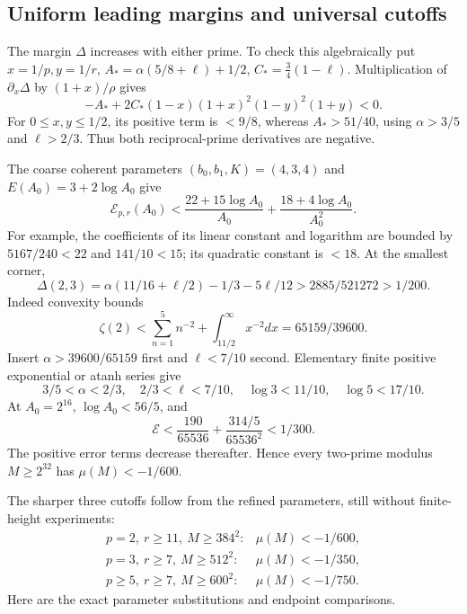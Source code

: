 \documentclass[11pt]{article}
\theoremstyle{definition}\newtheorem{definition}[theorem]{Definition}
\theoremstyle{remark}\newtheorem{remark}[theorem]{Remark}
\begin{document}
\subsection{Uniform leading margins and universal cutoffs}
\label{ap:universal-cutoffs}
The margin \(\Delta\) increases with either prime.
To check this algebraically put \(x=1/p,y=1/r\),
\(A_*=\alpha(5/8+\ell)+1/2\), \(C_*=\tfrac34(1-\ell)\).
Multiplication of \(\partial_x\Delta\) by \((1+x)/\rho\) gives
\[
 -A_*+2C_*(1-x)(1+x)^2(1-y)^2(1+y)<0 .
\]
For \(0\leq x,y\leq1/2\), its positive term is \(<9/8\), whereas
\(A_*>51/40\), using \(\alpha>3/5\) and \(\ell>2/3\).
Thus both reciprocal-prime derivatives are negative.

The coarse coherent parameters \((b_0,b_1,K)=(4,3,4)\) and
\(E(A_0)=3+2\log A_0\) give
\begin{equation}
 \mathcal E_{p,r}(A_0)<
 \frac{22+15\log A_0}{A_0}+\frac{18+4\log A_0}{A_0^2}.
 \label{ap:coarse-error}
\end{equation}
For example, the coefficients of its linear constant and logarithm are
bounded by \(5167/240<22\) and \(141/10<15\); its quadratic constant
is \(<18\).
At the smallest corner,
\[
 \Delta(2,3)=\alpha(11/16+\ell/2)-1/3-5\ell/12
             >2885/521272>1/200.
\]
Indeed convexity bounds
\[
\zeta(2)<\sum_{n=1}^5n^{-2}+\int_{11/2}^{\infty}x^{-2}dx
=65159/39600.
\]
Insert \(\alpha>39600/65159\) first and
\(\ell<7/10\) second. Elementary finite positive exponential or atanh
series give
\[
 3/5<\alpha<2/3,\quad 2/3<\ell<7/10,\quad
 \log3<11/10,\quad\log5<17/10 .
\]
At \(A_0=2^{16}\), \(\log A_0<56/5\), and
\[
 \mathcal E<
 \frac{190}{65536}+\frac{314/5}{65536^2}<1/300.
\]
The positive error terms decrease thereafter.
Hence every two-prime modulus \(M\geq2^{32}\) has
\(\mu(M)<-1/600\).

The sharper three cutoffs follow from the refined parameters, still
without finite-height experiments:
\begin{equation}
 \begin{array}{ll}
 p=2,\ r\geq11,\ M\geq384^2:&\mu(M)<-1/600,\\
 p=3,\ r\geq7,\ M\geq512^2:&\mu(M)<-1/350,\\
 p\geq5,\ r\geq7,\ M\geq600^2:&\mu(M)<-1/750 .
 \end{array}
 \label{ap:three-cutoffs}
\end{equation}
Here are the exact parameter substitutions and endpoint comparisons.
\end{document}
